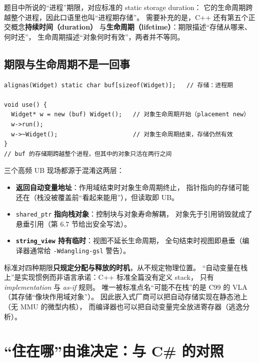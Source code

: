 \documentclass[12pt,a4paper,fontset=fandol]{ctexbook}
\begin{document}
题目中所说的``进程''期限，对应标准的 static storage duration：
它的生命周期跨越整个进程，因此口语里也叫``进程期存储''。
需要补充的是，C++ 还有第五个正交概念\textbf{持续时间（duration）}
与\textbf{生命周期（lifetime）}：期限描述``存储从哪来、何时还''，
生命周期描述``对象何时有效''，两者并不等同。

\subsection{期限与生命周期不是一回事}

\begin{lstlisting}
alignas(Widget) static char buf[sizeof(Widget)];   // 存储：进程期

void use() {
  Widget* w = new (buf) Widget();   // 对象生命周期开始（placement new）
  w->run();
  w->~Widget();                     // 对象生命周期结束，存储仍然有效
}
// buf 的存储期跨越整个进程，但其中的对象只活在两行之间
\end{lstlisting}

三个高频 UB 现场都源于混淆这两层：

\begin{itemize}
  \item \textbf{返回自动变量地址}：作用域结束时对象生命周期终止，
        指针指向的存储可能还在（栈没被覆盖前``看起来能用''），但读取即 UB。
  \item \texttt{shared\_ptr} \textbf{指向栈对象}：控制块与对象寿命解耦，
        对象先于引用销毁就成了悬垂引用（第 6.7 节给出安全写法）。
  \item \textbf{\texttt{string\_view} 持有临时}：视图不延长生命周期，
        全句结束时视图即悬垂（编译器通常给 \texttt{-Wdangling-gsl} 警告）。
\end{itemize}

\begin{note}[title=``不规定位置''的准确程度]
标准对四种期限\textbf{只规定分配与释放的时机}，从不规定物理位置。
``自动变量在栈上''是实现惯例而非语言承诺：C++ 标准全篇没有定义 stack，
只有 \textit{implementation} 与 \textit{as-if} 规则。
唯一被标准点名``可能不在栈''的是 C99 的 VLA（其存储``像块作用域对象''）。
因此嵌入式厂商可以把自动存储实现在静态池上（无 MMU 的微型内核），
而编译器也可以把自动变量完全放进寄存器（逃逸分析）。
\end{note}

\section{``住在哪''由谁决定：与 C\# 的对照}
\end{document}
